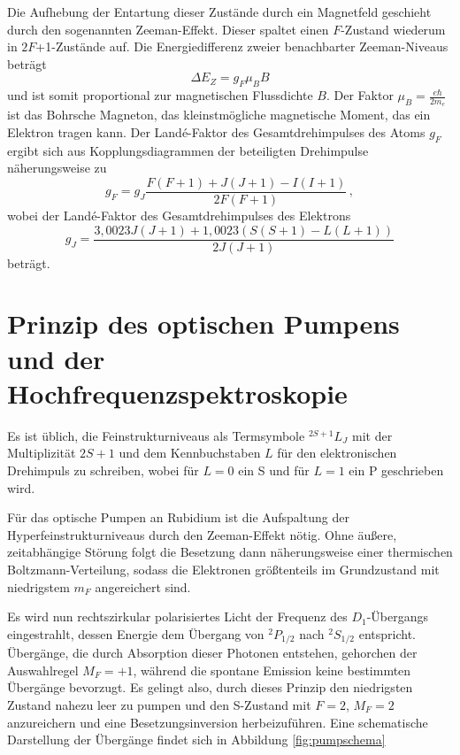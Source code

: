   Die Aufhebung der Entartung dieser Zustände durch ein Magnetfeld geschieht durch den sogenannten Zeeman-Effekt. Dieser spaltet einen $F$-Zustand wiederum in $2F$+1-Zustände auf. Die Energiedifferenz zweier benachbarter Zeeman-Niveaus beträgt
  \begin{equation}
    \Delta E_Z = g_F \mu_B B
    \label{eqn:zeemanDifferenz}
  \end{equation}
  und ist somit proportional zur magnetischen Flussdichte $B$. Der Faktor $\mu_B = \frac{e \hbar}{2m_e}$ ist das Bohrsche Magneton, das kleinstmögliche magnetische Moment, das ein Elektron tragen kann. Der Landé-Faktor des Gesamtdrehimpulses des Atoms $g_F$ ergibt sich aus Kopplungsdiagrammen der beteiligten Drehimpulse näherungsweise zu
  \begin{equation}
    g_F = g_J \frac{F(F+1)+J(J+1)-I(I+1)}{2F(F+1)}\,,
    \label{eqn:g_F_Theorie}
  \end{equation}
  wobei der Landé-Faktor des Gesamtdrehimpulses des Elektrons
  \begin{equation}
    g_J = \frac{3,0023J(J+1)+1,0023(S(S+1)-L(L+1))}{2J(J+1)}
    \label{eqn:g_J_Theorie}
  \end{equation}
  beträgt.

  \section{Prinzip des optischen Pumpens und der Hochfrequenzspektroskopie}
  \label{subsec:prinzipOptischesPumpen}

  Es ist üblich, die Feinstrukturniveaus als Termsymbole ${}^{2S+1}L_J$ mit der Multiplizität $2S+1$ und dem Kennbuchstaben $L$ für den elektronischen Drehimpuls zu schreiben, wobei für $L=0$ ein S und für $L=1$ ein P geschrieben wird.

  Für das optische Pumpen an Rubidium ist die Aufspaltung der Hyperfeinstrukturniveaus durch den Zeeman-Effekt nötig. Ohne äußere, zeitabhängige Störung folgt die Besetzung dann näherungsweise einer thermischen Boltzmann-Verteilung, sodass die Elektronen größtenteils im Grundzustand mit niedrigstem $m_F$ angereichert sind.

  Es wird nun rechtszirkular polarisiertes Licht der Frequenz des $D_1$-Übergangs eingestrahlt, dessen Energie dem Übergang von ${}^{2}P_{1/2}$ nach ${}^{2}S_{1/2}$ entspricht. Übergänge, die durch Absorption dieser Photonen entstehen, gehorchen der Auswahlregel $M_F=+1$, während die spontane Emission keine bestimmten Übergänge bevorzugt. Es gelingt also, durch dieses Prinzip den niedrigsten Zustand nahezu leer zu pumpen und den S-Zustand mit $F=2$, $M_F=2$ anzureichern und eine Besetzungsinversion herbeizuführen. Eine schematische Darstellung der Übergänge findet sich in Abbildung \ref{fig:pumpschema}

